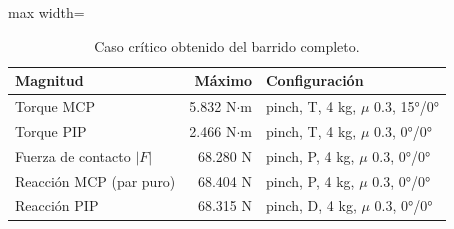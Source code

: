 \begin{table}[H]
\centering

\begin{adjustbox}{max width=\textwidth}
\begin{tabular}{|l|r|l|}
\hline
\textbf{Magnitud} & \textbf{Máximo} & \textbf{Configuración} \\ \hline
Torque MCP & 5.832 N$\cdot$m & pinch, T, 4 kg, $\mu$ 0.3, 15°/0° \\ \hline
Torque PIP & 2.466 N$\cdot$m & pinch, T, 4 kg, $\mu$ 0.3, 0°/0° \\ \hline
Fuerza de contacto $|F|$ & 68.280 N & pinch, P, 4 kg, $\mu$ 0.3, 0°/0° \\ \hline
Reacción MCP (par puro) & 68.404 N & pinch, P, 4 kg, $\mu$ 0.3, 0°/0° \\ \hline
Reacción PIP & 68.315 N & pinch, D, 4 kg, $\mu$ 0.3, 0°/0° \\ \hline
\end{tabular}
\end{adjustbox}
\caption{Caso crítico obtenido del barrido completo.}
\label{tab:critico}
\end{table}